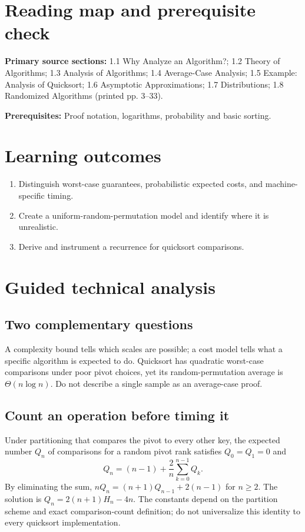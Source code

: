 \documentclass[11pt]{article}
\begin{document}
\makedoctocpage
\section{Reading map and prerequisite check}
\noindent\textbf{Primary source sections:} 1.1 Why Analyze an Algorithm?; 1.2 Theory of Algorithms; 1.3 Analysis of Algorithms; 1.4 Average-Case Analysis; 1.5 Example: Analysis of Quicksort; 1.6 Asymptotic Approximations; 1.7 Distributions; 1.8 Randomized Algorithms (printed pp. 3--33).\par
\noindent\textbf{Prerequisites:} Proof notation, logarithms, probability and basic sorting.\par
\section{Learning outcomes}
\begin{enumerate}
\item Distinguish worst-case guarantees, probabilistic expected costs, and machine-specific timing.
\item Create a uniform-random-permutation model and identify where it is unrealistic.
\item Derive and instrument a recurrence for quicksort comparisons.
\end{enumerate}
\section{Guided technical analysis}
\subsection{Two complementary questions}
A complexity bound tells which scales are possible; a cost model tells what a specific algorithm is expected to do. Quicksort has quadratic worst-case comparisons under poor pivot choices, yet its random-permutation average is $\Theta(n\log n)$. Do not describe a single sample as an average-case proof.
\subsection{Count an operation before timing it}
Under partitioning that compares the pivot to every other key, the expected number $Q_n$ of comparisons for a random pivot rank satisfies $Q_0=Q_1=0$ and
\[
Q_n=(n-1)+\frac{2}{n}\sum_{k=0}^{n-1}Q_k.
\]
By eliminating the sum, $nQ_n=(n+1)Q_{n-1}+2(n-1)$ for $n\ge2$. The solution is $Q_n=2(n+1)H_n-4n$. The constants depend on the partition scheme and exact comparison-count definition; do not universalize this identity to every quicksort implementation.
\end{document}
